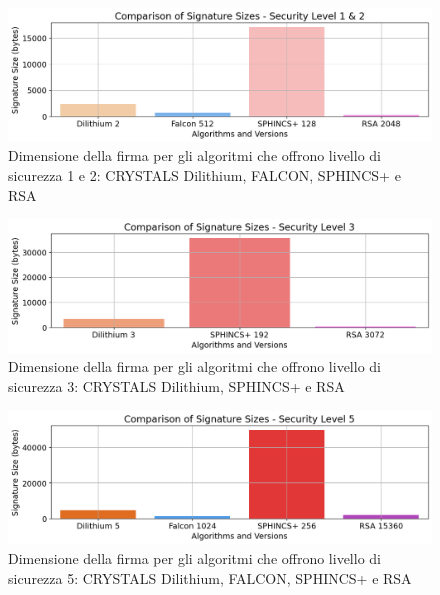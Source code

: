 \begin{figure}[H]
    \centering
    \includegraphics[width=1\textwidth]{Immagini/20240822_i9/Message_IO/IO_128bit_security_level.png}
    \caption{Dimensione della firma per gli algoritmi che offrono livello di sicurezza 1 e 2: CRYSTALS Dilithium, FALCON, SPHINCS+ e RSA}
    \label{fig:IO_128bit_security_level}
\end{figure}

\begin{figure}[H]
    \centering
    \includegraphics[width=1\textwidth]{Immagini/20240822_i9/Message_IO/IO_192bit_security_level.png}
    \caption{Dimensione della firma per gli algoritmi che offrono livello di sicurezza 3: CRYSTALS Dilithium, SPHINCS+ e RSA}
    \label{fig:IO_192bit_security_level}
\end{figure}

\begin{figure}[H]
    \centering
    \includegraphics[width=1\textwidth]{Immagini/20240822_i9/Message_IO/IO_256bit_security_level.png}
    \caption{Dimensione della firma per gli algoritmi che offrono livello di sicurezza 5: CRYSTALS Dilithium, FALCON, SPHINCS+ e RSA}
    \label{fig:IO_256bit_security_level}
\end{figure}

